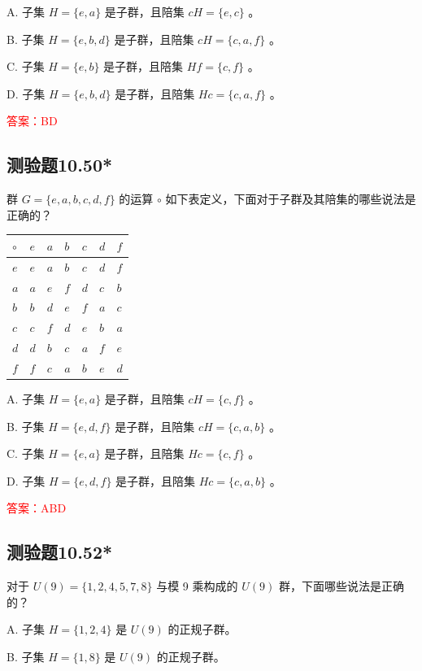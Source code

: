 \documentclass[UTF8, heading=true]{ctexart}
\begin{document}
A. 子集 $H=\{e, a\}$ 是子群，且陪集 $c H=\{e, c\}$ 。

B. 子集 $H=\{e, b, d\}$ 是子群，且陪集 $c H=\{c, a, f\}$ 。

C. 子集 $H=\{e, b\}$ 是子群，且陪集 $H f=\{c, f\}$ 。

D. 子集 $H=\{e, b, d\}$ 是子群，且陪集 $H c=\{c, a, f\}$ 。

\textcolor{red}{答案：BD}

\subsection{测验题10.50*}

群 $G=\{e, a, b, c, d, f\}$ 的运算 $\circ$ 如下表定义，下面对于子群及其陪集的哪些说法是正确的？
\begin{table}[H]
  \renewcommand{\arraystretch}{1.5}
  \centering
\begin{tabular}{l|llllll}
\hline$\circ$ & $e$ & $a$ & $b$ & $c$ & $d$ & $f$ \\
\hline$e$ & $e$ & $a$ & $b$ & $c$ & $d$ & $f$ \\
$a$ & $a$ & $e$ & $f$ & $d$ & $c$ & $b$ \\
$b$ & $b$ & $d$ & $e$ & $f$ & $a$ & $c$ \\
$c$ & $c$ & $f$ & $d$ & $e$ & $b$ & $a$ \\
$d$ & $d$ & $b$ & $c$ & $a$ & $f$ & $e$ \\
$f$ & $f$ & $c$ & $a$ & $b$ & $e$ & $d$ \\
\hline
\end{tabular}
\end{table}

A. 子集 $H=\{e, a\}$ 是子群，且陪集 $c H=\{c, f\}$ 。

B. 子集 $H=\{e, d, f\}$ 是子群，且陪集 $c H=\{c, a, b\}$ 。

C. 子集 $H=\{e, a\}$ 是子群，且陪集 $H c=\{c, f\}$ 。

D. 子集 $H=\{e, d, f\}$ 是子群，且陪集 $H c=\{c, a, b\}$ 。

\textcolor{red}{答案：ABD}

\subsection{测验题10.52*}

对于 $U(9)=\{1,2,4,5,7,8\}$ 与模 9 乘构成的 $U(9)$ 群，下面哪些说法是正确的？

A. 子集 $H=\{1,2,4\}$ 是 $U(9)$ 的正规子群。

B. 子集 $H=\{1,8\}$ 是 $U(9)$ 的正规子群。
\end{document}
